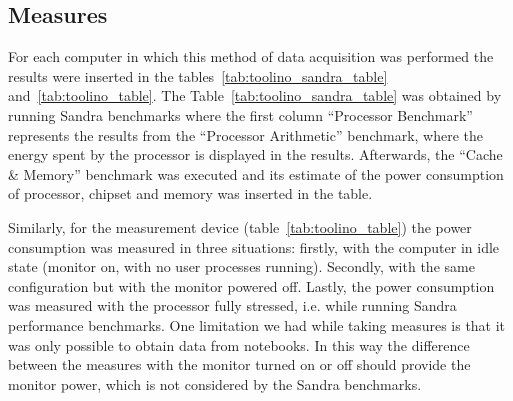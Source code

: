     \subsection{Measures}\label{sec3:measures}
        For each computer in which this method of data acquisition was performed the results were inserted in the tables~\ref{tab:toolino_sandra_table} and~\ref{tab:toolino_table}. The Table~\ref{tab:toolino_sandra_table} was obtained by running Sandra benchmarks where the first column ``Processor Benchmark'' represents the results from the ``Processor Arithmetic'' benchmark, where the energy spent by the processor is displayed in the results. Afterwards, the ``Cache \& Memory'' benchmark was executed and its estimate of the power consumption of processor, chipset and memory was inserted in the table.
        
        Similarly, for the measurement device (table~\ref{tab:toolino_table}) the power consumption was measured in three situations: firstly, with the computer in idle state (monitor on, with no user processes running). Secondly, with the same configuration but with the monitor powered off. Lastly, the power consumption was measured with the processor fully stressed, i.e. while running Sandra performance benchmarks. One limitation we had while taking measures is that it was only possible to obtain data from notebooks. In this way the difference between the measures with the monitor turned on or off should provide the monitor power, which is not considered by the Sandra benchmarks.
        
